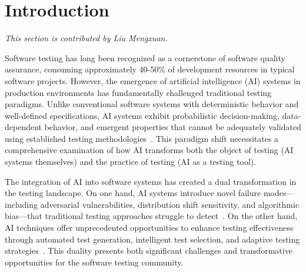 \documentclass[manuscript,screen,review]{acmart}
\begin{document}

\maketitle

\section{Introduction}
\textit{This section is contributed by Liu Mengxuan.}

Software testing has long been recognized as a cornerstone of software quality assurance, consuming approximately 40-50\% of development resources in typical software projects. However, the emergence of artificial intelligence (AI) systems in production environments has fundamentally challenged traditional testing paradigms. Unlike conventional software systems with deterministic behavior and well-defined specifications, AI systems exhibit probabilistic decision-making, data-dependent behavior, and emergent properties that cannot be adequately validated using established testing methodologies~\cite{Zhou2024}. This paradigm shift necessitates a comprehensive examination of how AI transforms both the object of testing (AI systems themselves) and the practice of testing (AI as a testing tool).

The integration of AI into software systems has created a dual transformation in the testing landscape. On one hand, AI systems introduce novel failure modes—including adversarial vulnerabilities, distribution shift sensitivity, and algorithmic bias—that traditional testing approaches struggle to detect~\cite{Kenfack2021}. On the other hand, AI techniques offer unprecedented opportunities to enhance testing effectiveness through automated test generation, intelligent test selection, and adaptive testing strategies~\cite{genprog, angelix}. This duality presents both significant challenges and transformative opportunities for the software testing community.
\end{document}
